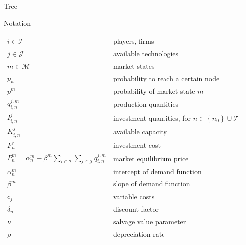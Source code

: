 \begin{frame}{Tree}
\begin{center}
{
\endpsmatrix}
\end{center}
\end{frame}

\begin{frame}{Notation}
  \begin{tabular}[l]{l l}
\centering
$i \in \mathcal{I}$ & players, firms \\
$j \in \mathcal{J}$ & available technologies \\
$m\in\mathcal{M}$ & market states \\
$p_n$ & probability to reach a certain node\\
$p^m$ & probability of market state $m$ \\
$ q_{i,n}^{j,m}$ & production quantities \\
$I_{i,n}^{j}$ & investment quantities, for $n\in\left\{n_0\right\}\cup\mathcal{T}$ \\
$K_{i,n}^{j}$ & available capacity\\
$F_n^{j}$ & investment cost\\
$P^m_n = \alpha_n^m-\beta^m\sum_{i\in \mathcal{I}}\sum_{j\in \mathcal{J}}q_{i,n}^{j,m}$ & market equilibrium price \\
$\alpha_n^m$ & intercept of demand function \\
$\beta^m$ & slope of demand function \\
$c_j$ & variable costs \\
$\delta_n$ & discount factor \\
$\nu$ & salvage value parameter\\
$\rho$ & depreciation rate\\
\end{tabular}
\end{frame}

